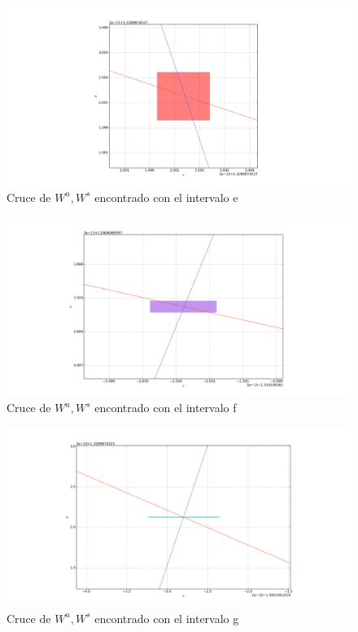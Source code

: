 \begin{figure}[H]
\centering
\includegraphics[scale=0.4]{cruce5}
\caption{Cruce de $W^{u},W^{s}$ encontrado con el intervalo e }
\label{cruce5}
\end{figure}

\begin{figure}[H]
\centering
\includegraphics[scale=0.4]{cruce6}
\caption{Cruce de $W^{u},W^{s}$ encontrado con el intervalo f }
\label{cruce6}
\end{figure}

\begin{figure}[H]
\centering
\includegraphics[scale=0.4]{cruce7}
\caption{Cruce de $W^{u},W^{s}$ encontrado con el intervalo g }
\label{cruce7}
\end{figure}

